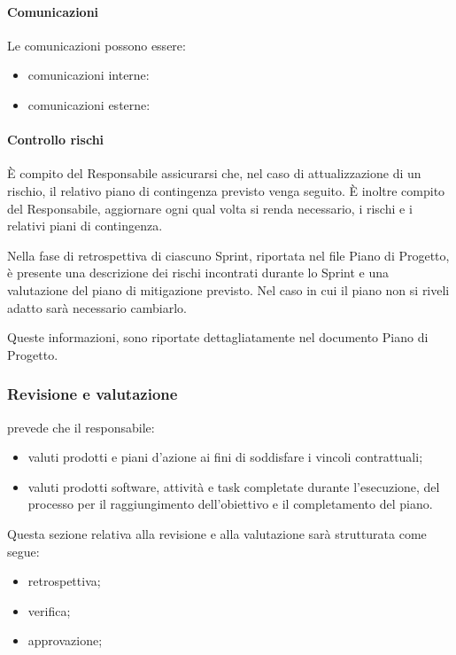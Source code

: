     \paragraph{Comunicazioni}
    Le comunicazioni possono essere:
    \begin{itemize}
        \item comunicazioni interne:
        \item comunicazioni esterne:
    \end{itemize}

    \paragraph{Controllo rischi}
    È compito del Responsabile assicurarsi che, nel caso di attualizzazione di un rischio, il relativo piano di contingenza previsto venga seguito.
    È inoltre compito del Responsabile, aggiornare ogni qual volta si renda necessario, i rischi e i relativi piani di contingenza.

    Nella fase di retrospettiva di ciascuno Sprint, riportata nel file Piano di Progetto, è presente una descrizione dei rischi incontrati durante lo Sprint e una valutazione del piano di mitigazione previsto. Nel caso in cui il piano non si riveli adatto sarà necessario cambiarlo. 
    
    Queste informazioni, sono riportate dettagliatamente nel documento Piano di Progetto.
    
    \subsubsection{Revisione e valutazione}\label{sec:review}
        prevede che il responsabile:
        \begin{itemize}
            \item valuti prodotti e piani d'azione ai fini di soddisfare i vincoli contrattuali;
            \item valuti prodotti software, attivit\`a e task completate durante l'esecuzione, del processo per il raggiungimento dell'obiettivo e il completamento del piano.
        \end{itemize}

        Questa sezione relativa alla revisione e alla valutazione sarà strutturata come segue:
        \begin{itemize}
            \item retrospettiva;
            \item verifica;
            \item approvazione;
        \end{itemize}


